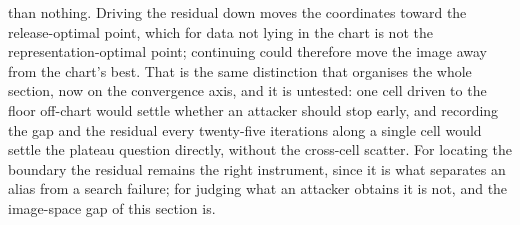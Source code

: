 $$than nothing. Driving the residual down moves the coordinates toward the
release-optimal point, which for data not lying in the chart is not the
representation-optimal point; continuing could therefore move the image away
from the chart's best. That is the same distinction that organises the whole
section, now on the convergence axis, and it is untested: one cell driven to
the floor off-chart would settle whether an attacker should stop early, and
recording the gap and the residual every twenty-five iterations along a
single cell would settle the plateau question directly, without the
cross-cell scatter. For
locating the boundary the residual remains the right instrument, since it is
what separates an alias from a search failure; for judging what an attacker
obtains it is not, and the image-space gap of this section is.



